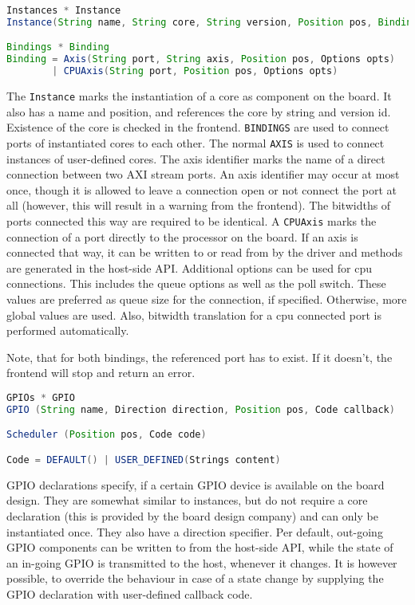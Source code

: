 \documentclass{report}
\begin{document}
\begin{lstlisting}[language=java, breaklines=true]
Instances * Instance
Instance(String name, String core, String version, Position pos, Bindings bind)

Bindings * Binding
Binding = Axis(String port, String axis, Position pos, Options opts)
        | CPUAxis(String port, Position pos, Options opts)
\end{lstlisting}

The \texttt{Instance} marks the instantiation of a core as component on the board. It also has a name and position, and references the core by string and version id. Existence of the core is checked in the frontend. \texttt{BINDINGS} are used to connect ports of instantiated cores to each other. The normal \texttt{AXIS} is used to connect instances of user-defined cores. The axis identifier marks the name of a direct connection between two AXI stream ports. An axis identifier may occur at most once, though it is allowed to leave a connection open or not connect the port at all (however, this will result in a warning from the frontend). The bitwidths of ports connected this way are required to be identical.
A \texttt{CPUAxis} marks the connection of a port directly to the processor on the board. If an axis is connected that way, it can be written to or read from by the driver and methods are generated in the host-side API. Additional options can be used for cpu connections. This includes the queue options as well as the poll switch. These values are preferred as queue size for the connection, if specified. Otherwise, more global values are used. Also, bitwidth translation for a cpu connected port is performed automatically.

Note, that for both bindings, the referenced port has to exist. If it doesn't, the frontend will stop and return an error. %

\begin{lstlisting}[language=java, breaklines=true]
GPIOs * GPIO
GPIO (String name, Direction direction, Position pos, Code callback)

Scheduler (Position pos, Code code)

Code = DEFAULT() | USER_DEFINED(Strings content)
\end{lstlisting}

GPIO declarations specify, if a certain GPIO device is available on the board design. They are somewhat similar to instances, but do not require a core declaration (this is provided by the board design company) and can only be instantiated once. They also have a direction specifier. Per default, out-going GPIO components can be written to from the host-side API, while the state of an in-going GPIO is transmitted to the host, whenever it changes. It is however possible, to override the behaviour in case of a state change by supplying the GPIO declaration with user-defined callback code. %
\end{document}
